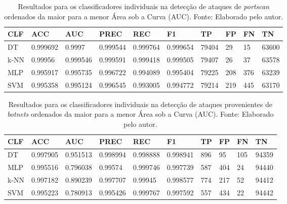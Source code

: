 \begin{longtable}{l|l|l|l|l|l|l|l|l|l}
\caption{Resultados para os classificadores individuais na detecção de ataques de \textit{portscan} ordenados da maior para a menor Área sob a Curva (AUC). Fonte: Elaborado pelo autor.}

\label{tab:resultados_ind_portscan}

\hline


\textbf{CLF} & \textbf{ACC} 		& \textbf{AUC}      & \textbf{PREC} 	 & \textbf{REC}            & \textbf{F1}       & \textbf{TP}   & \textbf{FP} & \textbf{FN}   & \textbf{TN}     \\ \hline \hline

DT   & 0.999692 & 0.9997   & 0.999544 & 0.999764 & 0.999654 & 79404 & 29  & 15  & 63600 \\ \hline
k-NN & 0.99956  & 0.999546 & 0.999591 & 0.999418 & 0.999505 & 79407 & 26  & 37  & 63578 \\ \hline
MLP  & 0.995917 & 0.995735 & 0.996722 & 0.994089 & 0.995404 & 79225 & 208 & 376 & 63239 \\ \hline
SVM  & 0.995358 & 0.995124 & 0.996545 & 0.993005 & 0.994772 & 79214 & 219 & 445 & 63170 \\ \hline
\end{longtable}













\begin{longtable}{l|l|l|l|l|l|l|l|l|l}
\caption{Resultados para os classificadores individuais na detecção de ataques provenientes de \textit{botnets} ordenados da maior para a menor Área sob a Curva (AUC). Fonte: Elaborado pelo autor.}

\label{tab:resultados_ind_botnets}

\hline


\textbf{CLF} & \textbf{ACC} 		& \textbf{AUC}      & \textbf{PREC} 	 & \textbf{REC}            & \textbf{F1}       & \textbf{TP}   & \textbf{FP} & \textbf{FN}   & \textbf{TN}     \\ \hline \hline

DT    & 0.997905 & 0.951513 & 0.998994 & 0.998888 & 0.998941 & 896 & 95  & 105 & 94359 \\ \hline
MLP   & 0.995516 & 0.796038 & 0.99574  & 0.999746 & 0.997739 & 587 & 404 & 24  & 94440 \\ \hline
k-NN  & 0.997182 & 0.890239 & 0.997707 & 0.99945  & 0.998577 & 774 & 217 & 52  & 94412 \\ \hline
SVM   & 0.995223 & 0.780913 & 0.995426 & 0.999767 & 0.997592 & 557 & 434 & 22  & 94442 \\ \hline
\end{longtable}










